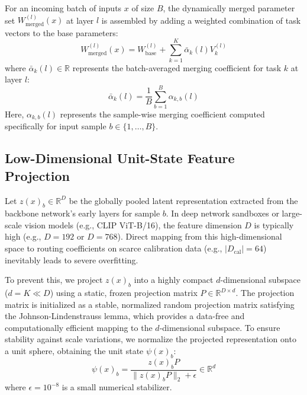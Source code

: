 For an incoming batch of inputs $x$ of size $B$, the dynamically merged parameter set $W_{\text{merged}}^{(l)}(x)$ at layer $l$ is assembled by adding a weighted combination of task vectors to the base parameters:
\begin{equation}
    W_{\text{merged}}^{(l)}(x) = W_{\text{base}}^{(l)} + \sum_{k=1}^K \bar{\alpha}_k(l) V_k^{(l)}
\end{equation}
where $\bar{\alpha}_k(l) \in \mathbb{R}$ represents the batch-averaged merging coefficient for task $k$ at layer $l$:
\begin{equation}
    \bar{\alpha}_k(l) = \frac{1}{B} \sum_{b=1}^B \alpha_{k, b}(l)
\end{equation}
Here, $\alpha_{k, b}(l)$ represents the sample-wise merging coefficient computed specifically for input sample $b \in \{1, \dots, B\}$.

\subsection{Low-Dimensional Unit-State Feature Projection}
Let $z(x)_b \in \mathbb{R}^D$ be the globally pooled latent representation extracted from the backbone network's early layers for sample $b$. In deep network sandboxes or large-scale vision models (e.g., CLIP ViT-B/16), the feature dimension $D$ is typically high (e.g., $D=192$ or $D=768$). Direct mapping from this high-dimensional space to routing coefficients on scarce calibration data (e.g., $|D_{\text{cal}}| = 64$) inevitably leads to severe overfitting.

To prevent this, we project $z(x)_b$ into a highly compact $d$-dimensional subspace ($d = K \ll D$) using a static, frozen projection matrix $P \in \mathbb{R}^{D \times d}$. The projection matrix is initialized as a stable, normalized random projection matrix satisfying the Johnson-Lindenstrauss lemma, which provides a data-free and computationally efficient mapping to the $d$-dimensional subspace. To ensure stability against scale variations, we normalize the projected representation onto a unit sphere, obtaining the unit state $\psi(x)_b$:
\begin{equation}
    \psi(x)_b = \frac{z(x)_b P}{\|z(x)_b P\|_2 + \epsilon} \in \mathbb{R}^d
\end{equation}
where $\epsilon = 10^{-8}$ is a small numerical stabilizer.

